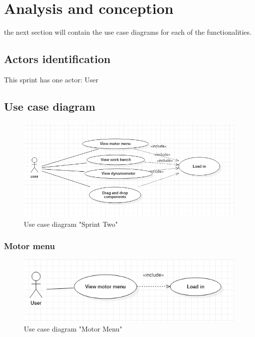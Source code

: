 \documentclass[]{report}
\begin{document}
\section{Analysis and conception}

the next section will contain the use case diagrams for each of the functionalities.
\subsection{Actors identification}
This sprint has one actor: User
\subsection{Use case diagram}
\begin{figure}[H]
		\includegraphics[scale=0.9, frame]{sprintTwoUseCase.png}
	\caption{Use case diagram "Sprint Two"}
	\end{figure}

\subsubsection{Motor menu}
\begin{figure}[H]
	\includegraphics[scale=0.9, frame]{motorMenuUseCase.png}
	\caption{Use case diagram "Motor Menu"}
	\end{figure}
\end{document}

